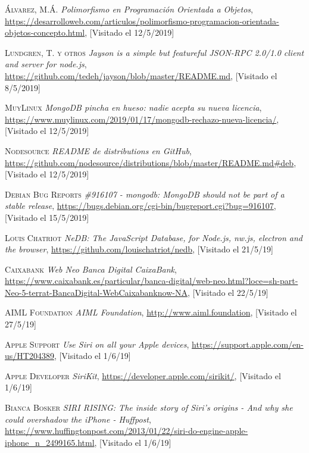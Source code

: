 \documentclass[spanish,12pt, a4paper, twoside]{paper}
\begin{document}
\begin{thebibliography}{00}
 \textsc{Álvarez, M.Á.} \textit{Polimorfismo en Programación Orientada a Objetos}, \url{https://desarrolloweb.com/articulos/polimorfismo-programacion-orientada-objetos-concepto.html}, [Visitado el 12/5/2019]

 \textsc{Lundgren, T. y otros} \textit{Jayson is a simple but featureful JSON-RPC 2.0/1.0 client and server for node.js}, \url{https://github.com/tedeh/jayson/blob/master/README.md}, [Visitado el 8/5/2019]

 \textsc{MuyLinux} \textit{MongoDB pincha en hueso: nadie acepta su nueva licencia}, \url{https://www.muylinux.com/2019/01/17/mongodb-rechazo-nueva-licencia/}, [Visitado el 12/5/2019]

 \textsc{Nodesource} \textit{README de distributions en GitHub}, \url{https://github.com/nodesource/distributions/blob/master/README.md#deb}, [Visitado el 12/5/2019]

 \textsc{Debian Bug Reports} \textit{\#916107 - mongodb: MongoDB should not be part of a stable release}, \url{https://bugs.debian.org/cgi-bin/bugreport.cgi?bug=916107}, [Visitado el 15/5/2019]

 \textsc{Louis Chatriot} \textit{NeDB: The JavaScript Database, for Node.js, nw.js, electron and the browser}, \url{https://github.com/louischatriot/nedb}, [Visitado el 21/5/19]

 \textsc{Caixabank} \textit{Web Neo \textbar Banca Digital \textbar CaixaBank}, \url{https://www.caixabank.es/particular/banca-digital/web-neo.html?loce=sh-part-Neo-5-terrat-BancaDigital-WebCaixabanknow-NA}, [Visitado el 22/5/19]

 \textsc{AIML Foundation} \textit{AIML Foundation}, \url{http://www.aiml.foundation}, [Visitado el 27/5/19]

 \textsc{Apple Support} \textit{Use Siri on all your Apple devices}, \url{https://support.apple.com/en-us/HT204389}, [Visitado el 1/6/19]

 \textsc{Apple Developer} \textit{SiriKit}, \url{https://developer.apple.com/sirikit/}, [Visitado el 1/6/19]

 \textsc{Bianca Bosker} \textit{SIRI RISING: The inside story of Siri's origins - And why she could overshadow the iPhone - Huffpost}, \url{https://www.huffingtonpost.com/2013/01/22/siri-do-engine-apple-iphone_n_2499165.html}, [Visitado el 1/6/19]


\end{thebibliography}
\end{document}
